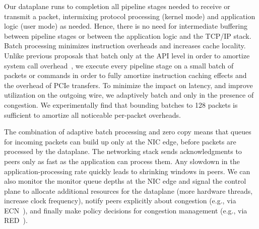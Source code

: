 

 Our dataplane
runs to completion all pipeline stages needed to receive or transmit a
packet, intermixing protocol processing (kernel mode) and application
logic (user mode) as needed. Hence, there is no need for intermediate
buffering between pipeline stages or between the application logic and
the TCP/IP stack. Batch processing minimizes instruction overheads and
increases cache locality.  Unlike previous proposals that batch only
at the API level in order to amortize system call
overhead~\cite{jeong2014mtcp,han2012megapipe}, we execute every
pipeline stage on a small batch of packets or commands in order to
fully amortize instruction caching effects and the overhead of PCIe
transfers.  To minimize the impact on latency, and improve utilization
on the outgoing wire, we adaptively batch and only in the presence of
congestion. We experimentally find that bounding batches to 128
packets is sufficient to amortize all noticeable per-packet overheads.

The combination of adaptive batch processing and zero copy means that
queues for incoming packets can build up only at the NIC edge, before
packets are processed by the dataplane. The networking stack sends
acknowledgments to peers only as fast as the application can process
them. Any slowdown in the application-processing rate quickly leads to
shrinking windows in peers. We can also monitor the monitor queue
depths at the NIC edge and signal the control plane to allocate
additional resources for the dataplane (more hardware threads,
increase clock frequency), notify peers explicitly about congestion
(e.g., via ECN~\cite{ramakrishnan2001addition}), and finally make
policy decisions for congestion management (e.g., via
RED~\cite{DBLP:journals/ton/FloydJ93}).

